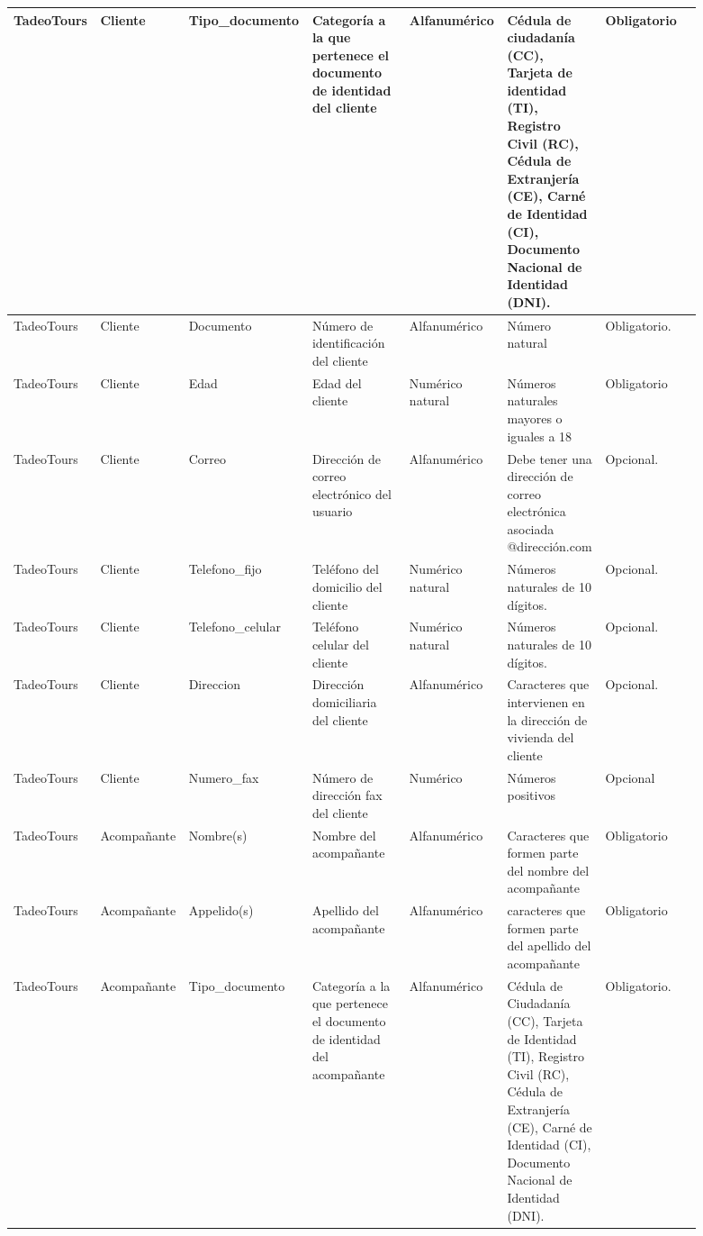 \documentclass{article}
\begin{document}
\begin{landscape}
\begin{longtable}{|C{0.102\linewidth}|C{0.102\linewidth}|C{0.142\linewidth}|C{0.142\linewidth}|C{0.122\linewidth}|C{0.142\linewidth}|C{0.142\linewidth}|}
TadeoTours & Cliente & Tipo\_documento & Categoría a la que pertenece el documento de identidad del cliente & Alfanumérico & Cédula de ciudadanía (CC), Tarjeta de identidad (TI), Registro Civil (RC), Cédula de Extranjería (CE), Carné de Identidad (CI), Documento Nacional de Identidad (DNI). & Obligatorio \\ \hline

TadeoTours & Cliente & Documento & Número de identificación del cliente & Alfanumérico & Número natural & Obligatorio. \\ \hline

TadeoTours & Cliente & Edad & Edad del cliente & Numérico natural & Números naturales mayores o iguales a 18 & Obligatorio \\ \hline

TadeoTours & Cliente & Correo & Dirección de correo electrónico del usuario & Alfanumérico & Debe tener una dirección de correo electrónica asociada @dirección.com & Opcional. \\ \hline

TadeoTours & Cliente & Telefono\_fijo & Teléfono del domicilio del cliente & Numérico natural & Números naturales de 10 dígitos. & Opcional. \\ \hline

TadeoTours & Cliente & Telefono\_celular & Teléfono celular del cliente & Numérico natural & Números naturales de 10 dígitos. & Opcional. \\ \hline

TadeoTours & Cliente & Direccion & Dirección domiciliaria del cliente & Alfanumérico & Caracteres que intervienen en la dirección de vivienda del cliente & Opcional. \\ \hline

TadeoTours & Cliente & Numero\_fax & Número de dirección fax del cliente & Numérico & Números positivos & Opcional \\ \hline

TadeoTours & Acompañante & Nombre(s) & Nombre del acompañante & Alfanumérico & Caracteres que formen parte del nombre del acompañante & Obligatorio \\ \hline

TadeoTours & Acompañante & Appelido(s) & Apellido del acompañante & Alfanumérico & caracteres que formen parte del apellido del acompañante & Obligatorio \\ \hline

TadeoTours & Acompañante & Tipo\_documento & Categoría a la que pertenece el documento de identidad del acompañante & Alfanumérico & Cédula de Ciudadanía (CC), Tarjeta de Identidad (TI), Registro Civil (RC), Cédula de Extranjería (CE), Carné de Identidad (CI), Documento Nacional de Identidad (DNI). & Obligatorio. \\ \hline


\end{longtable}
\end{landscape}
\end{document}
